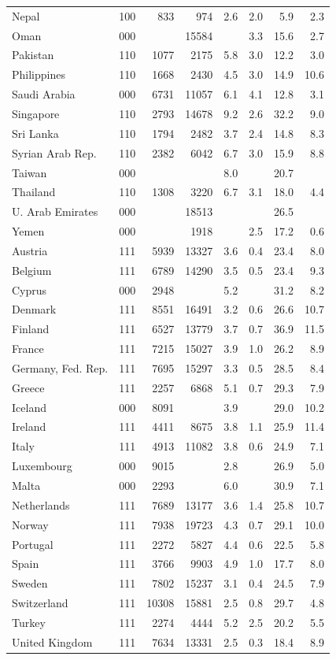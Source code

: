 \documentclass[11pt]{article}
\begin{document}
\begin{longtable}{lcrrrrrr}
Nepal&100&833&974&2.6&2.0&5.9&2.3\\
Oman&000&&15584&&3.3&15.6&2.7\\
Pakistan&110&1077&2175&5.8&3.0&12.2&3.0\\
Philippines&110&1668&2430&4.5&3.0&14.9&10.6\\
Saudi Arabia&000&6731&11057&6.1&4.1&12.8&3.1\\
Singapore&110&2793&14678&9.2&2.6&32.2&9.0\\
Sri Lanka&110&1794&2482&3.7&2.4&14.8&8.3\\
Syrian Arab Rep.&110&2382&6042&6.7&3.0&15.9&8.8\\
Taiwan&000&&&8.0&&20.7&\\
Thailand&110&1308&3220&6.7&3.1&18.0&4.4\\
U. Arab Emirates&000&&18513&&&26.5&\\
Yemen&000&&1918&&2.5&17.2&0.6\\
Austria&111&5939&13327&3.6&0.4&23.4&8.0\\
Belgium&111&6789&14290&3.5&0.5&23.4&9.3\\
Cyprus&000&2948&&5.2&&31.2&8.2\\
Denmark&111&8551&16491&3.2&0.6&26.6&10.7\\
Finland&111&6527&13779&3.7&0.7&36.9&11.5\\
France&111&7215&15027&3.9&1.0&26.2&8.9\\
Germany, Fed. Rep.&111&7695&15297&3.3&0.5&28.5&8.4\\
Greece&111&2257&6868&5.1&0.7&29.3&7.9\\
Iceland&000&8091&&3.9&&29.0&10.2\\
Ireland&111&4411&8675&3.8&1.1&25.9&11.4\\
Italy&111&4913&11082&3.8&0.6&24.9&7.1\\
Luxembourg&000&9015&&2.8&&26.9&5.0\\
Malta&000&2293&&6.0&&30.9&7.1\\
Netherlands&111&7689&13177&3.6&1.4&25.8&10.7\\
Norway&111&7938&19723&4.3&0.7&29.1&10.0\\
Portugal&111&2272&5827&4.4&0.6&22.5&5.8\\
Spain&111&3766&9903&4.9&1.0&17.7&8.0\\
Sweden&111&7802&15237&3.1&0.4&24.5&7.9\\
Switzerland&111&10308&15881&2.5&0.8&29.7&4.8\\
Turkey&111&2274&4444&5.2&2.5&20.2&5.5\\
United Kingdom&111&7634&13331&2.5&0.3&18.4&8.9\\

\end{longtable}
\end{document}
